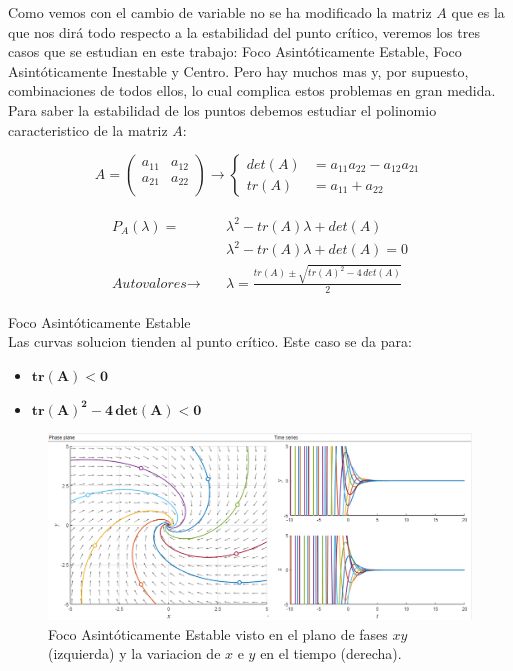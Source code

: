 \documentclass[12pt,a4paper]{report} %
\begin{document}
	Como vemos con el cambio de variable no se ha modificado la matriz $A$ que es la que nos dirá todo respecto a la estabilidad del punto crítico, veremos los tres casos que se estudian en este trabajo: Foco Asintóticamente Estable, Foco Asintóticamente Inestable y Centro. Pero hay muchos mas y, por supuesto, combinaciones de todos ellos, lo cual complica estos problemas en gran medida.\\[0.5cm]
	Para saber la estabilidad de los puntos debemos estudiar el polinomio caracteristico de la matriz $A$:
	
	\begin{equation}
		A=\begin{pmatrix}
			a_{11} & a_{12}\\
			a_{21} & a_{22}\\
		\end{pmatrix}\rightarrow\left\{
		\begin{aligned}
		det(A )&= a_{11}a_{22}-a_{12}a_{21} \\
		tr(A) &= a_{11}+a_{22}
	    \end{aligned}
		\right.
	\end{equation}\smallskip
	
	\begin{eqnarray}
		\begin{aligned}
		P_A(\lambda)=&\lambda^2-tr(A)\lambda+det(A) \nonumber \\[1mm]
		&\lambda^2-tr(A)\lambda+det(A)=0 \nonumber \\[1mm]
		\textit{Autovalores}\rightarrow \quad &\lambda=\frac{tr(A)\pm \sqrt{tr(A)^2-4\,det(A)}}{2}
	    \end{aligned}
	\end{eqnarray}
	
	\newpage

	{\Large\textbullet\quad Foco Asintóticamente Estable}\\[0.5cm]
	
	Las curvas solucion tienden al punto crítico. Este caso se da para: 
	\begin{itemize}
		\item $\bm{tr(A)<0}$
		\item $\bm{tr(A)^2-4\,det(A)<0}$
	\end{itemize}
	
	\begin{figure}[h]
		\centering
		\includegraphics[width=1\textwidth]{estable.png}
		\caption{Foco Asintóticamente Estable visto en el plano de fases $xy$ (izquierda) y la variacion de $x$ e $y$ en el tiempo (derecha).}
		\label{fig:estable}
	\end{figure}\smallskip
	
\end{document}
